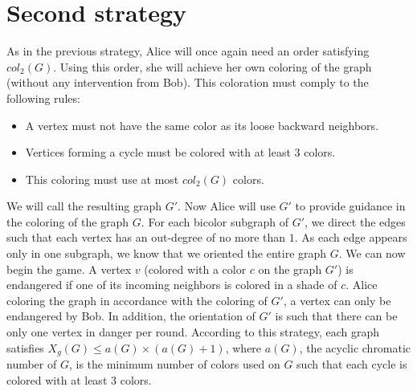 \section{Second strategy}

As in the previous strategy, Alice will once again need an order satisfying $col_{2}(G)$.
Using this order, she will achieve her own coloring of the graph (without any intervention from Bob).
This coloration must comply to the following rules:
\begin{itemize}
\item A vertex must not have the same color as its loose backward neighbors.
\item Vertices forming a cycle must be colored with at least 3 colors.
\item This coloring must use at most $col_{2}(G)$ colors.
\end{itemize}

We will call the resulting graph $G'$.
Now Alice will use $G'$ to provide guidance in the coloring of the graph $G$. For each bicolor subgraph of $G'$,
we direct the edges such that each vertex has an out-degree of no more than $1$. As each edge appears only in
one subgraph, we know that we oriented the entire graph $G$. We can now begin the game. 
A vertex $v$ (colored with a color $c$ on the graph $G'$) is endangered if one of its incoming neighbors is colored in a shade of $c$. Alice coloring the graph in accordance with the coloring of $G'$, a vertex can only be endangered by Bob. In addition, the orientation of $G'$ is such that there can be only one vertex in danger per round.
According to this strategy, each graph satisfies $X_{g}(G) \leq a(G) \times (a(G) + 1)$, where $a(G)$, the acyclic chromatic number of $G$, is the minimum number of colors used on $G$ such that each cycle is colored with at least $3$ colors.